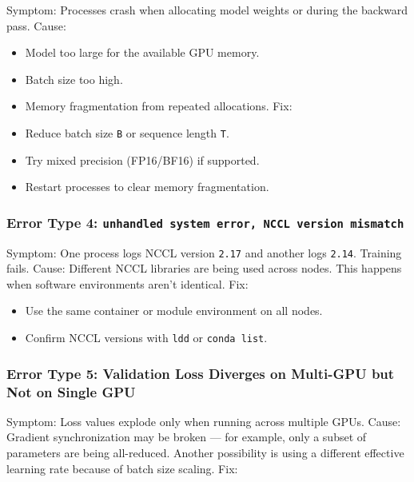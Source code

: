 \documentclass[
  letterpaper,
  DIV=11,
  numbers=noendperiod]{scrreprt}
\providecommand{\tightlist}{%
  \setlength{\itemsep}{0pt}\setlength{\parskip}{0pt}}
\begin{document}
Symptom: Processes crash when allocating model weights or during the
backward pass. Cause:

\begin{itemize}
\tightlist
\item
  Model too large for the available GPU memory.
\item
  Batch size too high.
\item
  Memory fragmentation from repeated allocations. Fix:
\item
  Reduce batch size \texttt{B} or sequence length \texttt{T}.
\item
  Try mixed precision (FP16/BF16) if supported.
\item
  Restart processes to clear memory fragmentation.
\end{itemize}

\subsubsection{\texorpdfstring{Error Type 4:
\texttt{unhandled\ system\ error,\ NCCL\ version\ mismatch}}{Error Type 4: unhandled system error, NCCL version mismatch}}\label{error-type-4-unhandled-system-error-nccl-version-mismatch}

Symptom: One process logs NCCL version \texttt{2.17} and another logs
\texttt{2.14}. Training fails. Cause: Different NCCL libraries are being
used across nodes. This happens when software environments aren't
identical. Fix:

\begin{itemize}
\tightlist
\item
  Use the same container or module environment on all nodes.
\item
  Confirm NCCL versions with \texttt{ldd} or \texttt{conda\ list}.
\end{itemize}

\subsubsection{Error Type 5: Validation Loss Diverges on Multi-GPU but
Not on Single
GPU}\label{error-type-5-validation-loss-diverges-on-multi-gpu-but-not-on-single-gpu}

Symptom: Loss values explode only when running across multiple GPUs.
Cause: Gradient synchronization may be broken --- for example, only a
subset of parameters are being all-reduced. Another possibility is using
a different effective learning rate because of batch size scaling. Fix:
\end{document}
